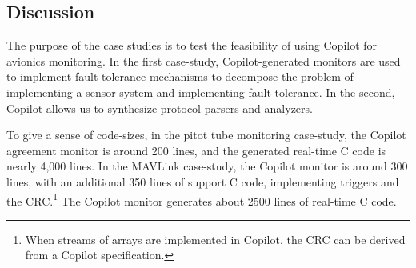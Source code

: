 \subsection{Discussion}
The purpose of the case studies is to test the feasibility of using Copilot for
avionics monitoring.  In the first case-study, Copilot-generated monitors are
used to implement fault-tolerance mechanisms to decompose the problem of
implementing a sensor system and implementing fault-tolerance.  In the second,
Copilot allows us to synthesize protocol parsers and analyzers.

To give a sense of code-sizes, in the pitot tube monitoring case-study, the
Copilot agreement monitor is around 200 lines, and the generated real-time C
code is nearly 4,000 lines.  In the MAVLink case-study, the Copilot monitor is
around 300 lines, with an additional 350 lines of support C code, implementing
triggers and the CRC.\footnote{When streams of arrays are implemented in
  Copilot, the CRC can be derived from a Copilot specification.}  The Copilot
monitor generates about 2500 lines of real-time C code.





